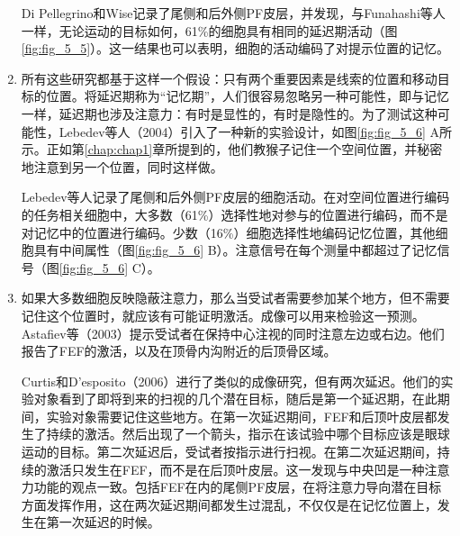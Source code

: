 \begin{enumerate}
	Di Pellegrino和Wise记录了尾侧和后外侧PF皮层，并发现，与Funahashi等人一样，无论运动的目标如何，61\%的细胞具有相同的延迟期活动（图\ref{fig:fig_5_5}）。这一结果也可以表明，细胞的活动编码了对提示位置的记忆。
	\item 所有这些研究都基于这样一个假设：只有两个重要因素是线索的位置和移动目标的位置。将延迟期称为“记忆期”，人们很容易忽略另一种可能性，即与记忆一样，延迟期也涉及注意力：有时是显性的，有时是隐性的。为了测试这种可能性，Lebedev等人（2004）引入了一种新的实验设计，如图\ref{fig:fig_5_6} A所示。正如第\ref{chap:chap1}章所提到的，他们教猴子记住一个空间位置，并秘密地注意到另一个位置，同时这样做。
	
	Lebedev等人记录了尾侧和后外侧PF皮层的细胞活动。在对空间位置进行编码的任务相关细胞中，大多数（61\%）选择性地对参与的位置进行编码，而不是对记忆中的位置进行编码。少数（16\%）细胞选择性地编码记忆位置，其他细胞具有中间属性（图\ref{fig:fig_5_6} B）。注意信号在每个测量中都超过了记忆信号（图\ref{fig:fig_5_6} C）。
	\item 如果大多数细胞反映隐蔽注意力，那么当受试者需要参加某个地方，但不需要记住这个位置时，就应该有可能证明激活。成像可以用来检验这一预测。Astafiev等（2003）提示受试者在保持中心注视的同时注意左边或右边。他们报告了FEF的激活，以及在顶骨内沟附近的后顶骨区域。
	
	Curtis和D’esposito（2006）进行了类似的成像研究，但有两次延迟。他们的实验对象看到了即将到来的扫视的几个潜在目标，随后是第一个延迟期，在此期间，实验对象需要记住这些地方。在第一次延迟期间，FEF和后顶叶皮层都发生了持续的激活。然后出现了一个箭头，指示在该试验中哪个目标应该是眼球运动的目标。第二次延迟后，受试者按指示进行扫视。在第二次延迟期间，持续的激活只发生在FEF，而不是在后顶叶皮层。这一发现与中央凹是一种注意力功能的观点一致。包括FEF在内的尾侧PF皮层，在将注意力导向潜在目标方面发挥作用，这在两次延迟期间都发生过混乱，不仅仅是在记忆位置上，发生在第一次延迟的时候。
\end{enumerate}


